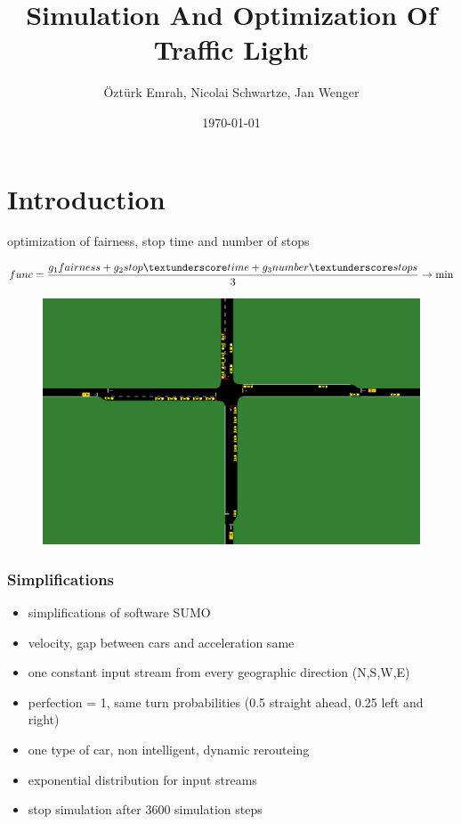 \documentclass{beamer}
\title{Simulation And Optimization Of Traffic Light}
\author{Öztürk Emrah, Nicolai Schwartze, Jan Wenger}
\date{\today}
\begin{document}
	\maketitle
	
	\section{Introduction}
	\frame{\tableofcontents[currentsection]}
	\begin{frame}
		optimization of fairness, stop time and number of stops

		\begin{equation*}\label{key}
		func = \frac{g_{1}fairness + g_{2}stop\textunderscore time+g_{3}number\textunderscore stops}{3}\rightarrow \min
		\end{equation*}
		
		\begin{figure}[H]
			\centering
			\includegraphics[width=0.7\linewidth]{"sumo2"}
			\label{fig:sumo2}
		\end{figure}
	\end{frame}

	\begin{frame}
	\frametitle{Simplifications}
		\begin{itemize}
			\item simplifications of software SUMO
			\item velocity, gap between cars and acceleration same
			\item one constant input stream from every geographic direction (N,S,W,E)
			\item perfection = 1, same turn probabilities (0.5 straight ahead, 0.25 left and right)
			\item one type of car, non intelligent, dynamic rerouteing
			\item exponential distribution for input streams
			\item stop simulation after 3600 simulation steps
		\end{itemize}
		
	\end{frame}
	
\end{document}
